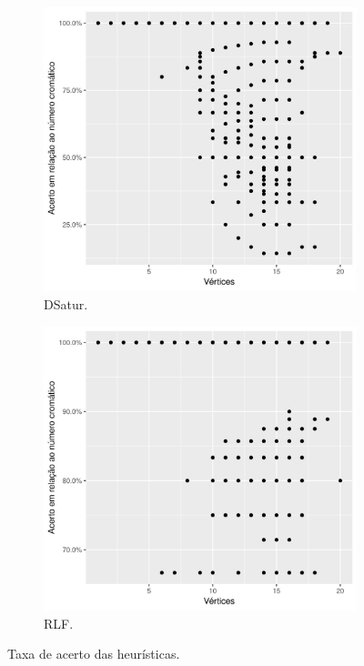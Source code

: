 \documentclass[12pt]{article}
\begin{document}
\begin{center}
\begin{figure}
\begin{subfigure}[b]{.49\linewidth}
\centering
\includegraphics[width=\linewidth/2]{greedy-ac-d}
\caption{DSatur.}\label{fig:greedy-ac-d}
\end{subfigure}
\begin{subfigure}[b]{.49\linewidth}
\centering
\includegraphics[width=\linewidth/2]{greedy-ac-r}
\caption{RLF.}\label{fig:greedy-ac-r}
\end{subfigure}
\caption{Taxa de acerto das heurísticas.}\label{fig:greedy-ac}
\end{figure}
\end{center}
\end{document}

